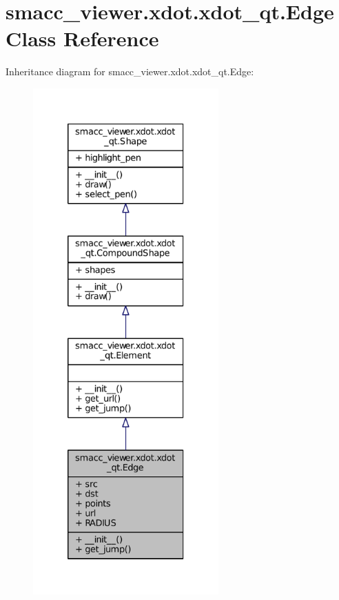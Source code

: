 \hypertarget{classsmacc__viewer_1_1xdot_1_1xdot__qt_1_1Edge}{}\section{smacc\+\_\+viewer.\+xdot.\+xdot\+\_\+qt.\+Edge Class Reference}
\label{classsmacc__viewer_1_1xdot_1_1xdot__qt_1_1Edge}


Inheritance diagram for smacc\+\_\+viewer.\+xdot.\+xdot\+\_\+qt.\+Edge\+:
\nopagebreak
\begin{figure}[H]
\begin{center}
\leavevmode
\includegraphics[height=550pt]{classsmacc__viewer_1_1xdot_1_1xdot__qt_1_1Edge__inherit__graph}
\end{center}
\end{figure}


